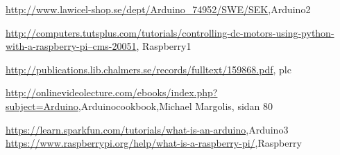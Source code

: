 \documentclass[11pt,a4paper,oneside]{book}
\begin{document}
\begin{thebibliography}{1}
\href{http://www.lawicel-shop.se/dept/Arduino_74952/SWE/SEK}{http://www.lawicel-shop.se/dept/Arduino_74952/SWE/SEK},Arduino2

\href{http://computers.tutsplus.com/tutorials/controlling-dc-motors-using-python-with-a-raspberry-pi--cms-20051}{http://computers.tutsplus.com/tutorials/controlling-dc-motors-using-python-with-a-raspberry-pi--cms-20051}, Raspberry1

\href{http://publications.lib.chalmers.se/records/fulltext/159868.pdf}{http://publications.lib.chalmers.se/records/fulltext/159868.pdf}, plc

\href{http://onlinevideolecture.com/ebooks/index.php?subject=Arduino  }{http://onlinevideolecture.com/ebooks/index.php?subject=Arduino},Arduinocookbook,Michael Margolis, sidan 80

\href{https://learn.sparkfun.com/tutorials/what-is-an-arduino}{https://learn.sparkfun.com/tutorials/what-is-an-arduino},Arduino3
\href{https://www.raspberrypi.org/help/what-is-a-raspberry-pi/}{https://www.raspberrypi.org/help/what-is-a-raspberry-pi/},Raspberry






\end{thebibliography}
\end{document}
